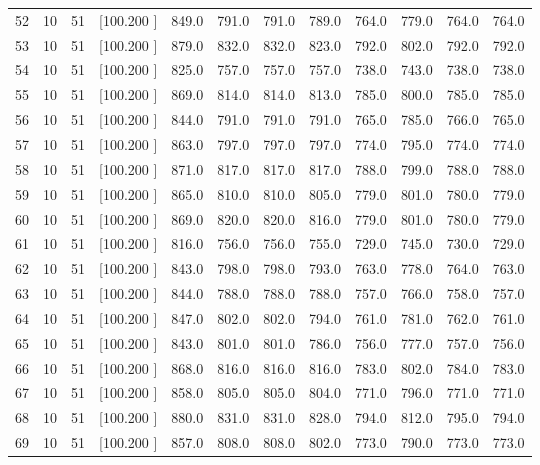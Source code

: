 \documentclass[12pt,a4paper]{article}
\begin{document}
\begin{center}
{\begin{tabular}{r r r r r r r r r r r r}
  52& 10& 51&[100.200   ]&   849.0&   791.0&   791.0&   789.0&   764.0&   779.0&   764.0&   764.0\\[-0.02in]
  53& 10& 51&[100.200   ]&   879.0&   832.0&   832.0&   823.0&   792.0&   802.0&   792.0&   792.0\\[-0.02in]
  54& 10& 51&[100.200   ]&   825.0&   757.0&   757.0&   757.0&   738.0&   743.0&   738.0&   738.0\\[-0.02in]
  55& 10& 51&[100.200   ]&   869.0&   814.0&   814.0&   813.0&   785.0&   800.0&   785.0&   785.0\\[-0.02in]
  56& 10& 51&[100.200   ]&   844.0&   791.0&   791.0&   791.0&   765.0&   785.0&   766.0&   765.0\\[-0.02in]
  57& 10& 51&[100.200   ]&   863.0&   797.0&   797.0&   797.0&   774.0&   795.0&   774.0&   774.0\\[-0.02in]
  58& 10& 51&[100.200   ]&   871.0&   817.0&   817.0&   817.0&   788.0&   799.0&   788.0&   788.0\\[-0.02in]
  59& 10& 51&[100.200   ]&   865.0&   810.0&   810.0&   805.0&   779.0&   801.0&   780.0&   779.0\\[-0.02in]
  60& 10& 51&[100.200   ]&   869.0&   820.0&   820.0&   816.0&   779.0&   801.0&   780.0&   779.0\\[-0.02in]
  61& 10& 51&[100.200   ]&   816.0&   756.0&   756.0&   755.0&   729.0&   745.0&   730.0&   729.0\\[-0.02in]
  62& 10& 51&[100.200   ]&   843.0&   798.0&   798.0&   793.0&   763.0&   778.0&   764.0&   763.0\\[-0.02in]
  63& 10& 51&[100.200   ]&   844.0&   788.0&   788.0&   788.0&   757.0&   766.0&   758.0&   757.0\\[-0.02in]
  64& 10& 51&[100.200   ]&   847.0&   802.0&   802.0&   794.0&   761.0&   781.0&   762.0&   761.0\\[-0.02in]
  65& 10& 51&[100.200   ]&   843.0&   801.0&   801.0&   786.0&   756.0&   777.0&   757.0&   756.0\\[-0.02in]
  66& 10& 51&[100.200   ]&   868.0&   816.0&   816.0&   816.0&   783.0&   802.0&   784.0&   783.0\\[-0.02in]
  67& 10& 51&[100.200   ]&   858.0&   805.0&   805.0&   804.0&   771.0&   796.0&   771.0&   771.0\\[-0.02in]
  68& 10& 51&[100.200   ]&   880.0&   831.0&   831.0&   828.0&   794.0&   812.0&   795.0&   794.0\\[-0.02in]
  69& 10& 51&[100.200   ]&   857.0&   808.0&   808.0&   802.0&   773.0&   790.0&   773.0&   773.0\\[-0.02in]

\end{tabular}}
\end{center}
\end{document}
